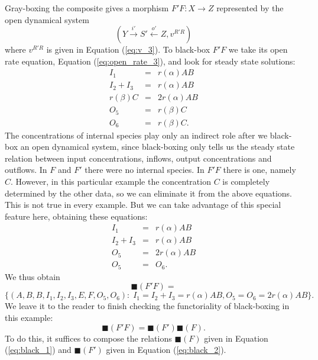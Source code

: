 \documentclass{compositionalityarticle}
\newcommand{\maps}{\colon}
\theoremstyle{compositionality}
\theoremstyle{remark}
\begin{document}
Gray-boxing the composite gives a morphism $F'F \maps X \to Z$ represented by the open dynamical system
\[         (Y \stackrel{i'}\longrightarrow S' \stackrel{o'}\longleftarrow Z, v^{R'R}) \]
where $v^{R'R}$ is given in Equation (\ref{eq:v_3}).   To black-box $F'F$ we take its open rate equation, Equation (\ref{eq:open_rate_3}), and look for steady state solutions:
\[
\begin{array}{rcl} 
I_1 &=& r(\alpha) AB \\
I_2 + I_3 &=& r(\alpha) AB \\ 
r(\beta) C &=& 2r(\alpha) AB  \\
O_5 &=& r(\beta) C \\
O_6 &=& r(\beta) C .
\end{array}
\]
The concentrations of internal species play only an indirect role after we black-box an open
dynamical system, since black-boxing only tells us the steady state relation between input concentrations, inflows, output concentrations and outflows.  In $F$ and $F'$ there were no internal species.  In $F'F$ there is one, namely $C$.  However, in this particular example the concentration $C$ is completely determined by the other data, so we can eliminate it from the above equations.  This is not true in every example.  But we can take advantage of this special feature here, obtaining these equations:
\[
\begin{array}{rcl} 
I_1 &=& r(\alpha) AB \\
I_2 + I_3 &=& r(\alpha) AB \\ 
O_5 &=& 2r(\alpha) AB  \\
O_5 &=& O_6 .
\end{array}
\]
We thus obtain
\begin{equation}
\label{eq:black_3}
\blacksquare(F'F)= 
\end{equation}
\[  \{ (A,B,B,I_1,I_2,I_3,E,F,O_5,O_6) : \; I_1  = I_2 + I_3 = r(\alpha) AB, O_5 = O_6 = 2 r(\alpha) AB \}   .\]
We leave it to the reader to finish checking the functoriality of black-boxing in this example:
\[         \blacksquare(F' F) = \blacksquare(F') \blacksquare(F) .\]
To do this, it suffices to compose the relations $\blacksquare(F)$ given in Equation (\ref{eq:black_1}) and $\blacksquare(F')$ given in Equation (\ref{eq:black_2}).
\end{document}
